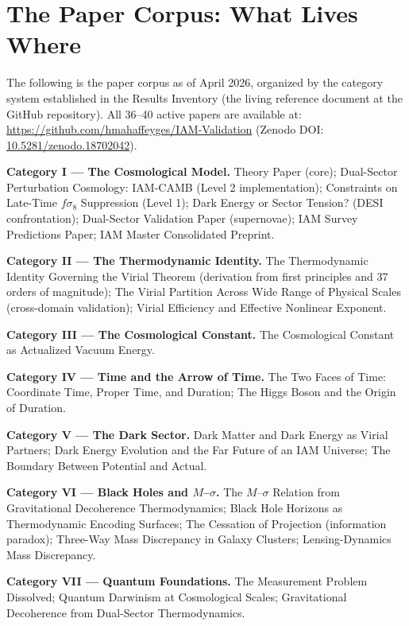 \documentclass[12pt,a4paper]{article}
\begin{document}
\section{The Paper Corpus: What Lives Where}
\label{sec:papers}

The following is the paper corpus as of April 2026, organized by the category
system established in the Results Inventory (the living reference document at
the GitHub repository). All 36--40 active papers are available at:
\url{https://github.com/hmahaffeyges/IAM-Validation}
(Zenodo DOI: \href{https://doi.org/10.5281/zenodo.18702042}{10.5281/zenodo.18702042}).

\textbf{Category I --- The Cosmological Model.} Theory Paper (core);
Dual-Sector Perturbation Cosmology: IAM-CAMB (Level 2 implementation);
Constraints on Late-Time $f\sigma_8$ Suppression (Level 1); Dark Energy or
Sector Tension? (DESI confrontation); Dual-Sector Validation Paper
(supernovae); IAM Survey Predictions Paper; IAM Master Consolidated Preprint.

\textbf{Category II --- The Thermodynamic Identity.} The Thermodynamic Identity
Governing the Virial Theorem (derivation from first principles and 37 orders of
magnitude); The Virial Partition Across Wide Range of Physical Scales
(cross-domain validation); Virial Efficiency and Effective Nonlinear Exponent.

\textbf{Category III --- The Cosmological Constant.}
The Cosmological Constant as Actualized Vacuum Energy.

\textbf{Category IV --- Time and the Arrow of Time.}
The Two Faces of Time: Coordinate Time, Proper Time, and Duration;
The Higgs Boson and the Origin of Duration.

\textbf{Category V --- The Dark Sector.}
Dark Matter and Dark Energy as Virial Partners;
Dark Energy Evolution and the Far Future of an IAM Universe;
The Boundary Between Potential and Actual.

\textbf{Category VI --- Black Holes and $M$--$\sigma$.}
The $M$--$\sigma$ Relation from Gravitational Decoherence Thermodynamics;
Black Hole Horizons as Thermodynamic Encoding Surfaces;
The Cessation of Projection (information paradox);
Three-Way Mass Discrepancy in Galaxy Clusters;
Lensing-Dynamics Mass Discrepancy.

\textbf{Category VII --- Quantum Foundations.}
The Measurement Problem Dissolved;
Quantum Darwinism at Cosmological Scales;
Gravitational Decoherence from Dual-Sector Thermodynamics.
\end{document}

